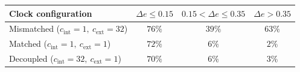 \begin{tabular}{@{}lccc@{}}
  \toprule
  Clock configuration & $\Delta e \le 0.15$ & $0.15 < \Delta e \le 0.35$ & $\Delta e > 0.35$ \\
  \midrule
  Mismatched ($c_{\mathrm{int}}{=}1,\ c_{\mathrm{ext}}{=}32$) & $76\%$ & $39\%$ & $63\%$ \\
  Matched ($c_{\mathrm{int}}{=}1,\ c_{\mathrm{ext}}{=}1$) & $72\%$ & $6\%$ & $2\%$ \\
  Decoupled ($c_{\mathrm{int}}{=}32,\ c_{\mathrm{ext}}{=}1$) & $70\%$ & $6\%$ & $3\%$ \\
  \bottomrule
\end{tabular}
